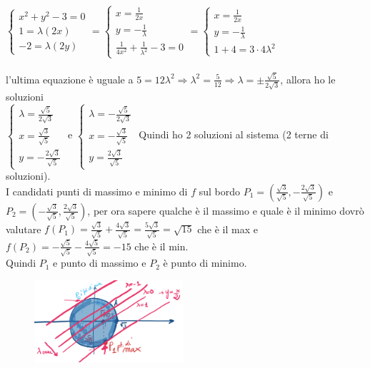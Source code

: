 \begin{example}
\begin{enumerate}
\begin{enumerate}
        $\begin{cases}x^2 + y^2 - 3 = 0 \\ 1 = \lambda (2x) \\ -2 = \lambda(2y)\end{cases} = \begin{cases}x = \frac{1}{2x} \\ y = -\frac{1}{\lambda} \\ \frac{1}{4x^2} + \frac{1}{\lambda^2} - 3 = 0\end{cases} = \begin{cases}x = \frac{1}{2x} \\ y = -\frac{1}{\lambda} \\ 1 + 4 = 3 \cdot 4 \lambda^2\end{cases}$\\\\
        l'ultima equazione è uguale a $5 = 12\lambda^2 \Longrightarrow \lambda^2 = \frac{5}{12} \Longrightarrow \lambda = \pm \frac{\sqrt{5}}{2\sqrt{3}}$, allora ho le soluzioni\\
        $\begin{cases}\lambda = \frac{\sqrt{5}}{2\sqrt{3}} \\ x = \frac{\sqrt{3}}{\sqrt{5}} \\ y = -\frac{2\sqrt{3}}{\sqrt{5}}\end{cases}$ e $\begin{cases}\lambda = -\frac{\sqrt{5}}{2\sqrt{3}} \\ x = -\frac{\sqrt{3}}{\sqrt{5}} \\ y = \frac{2\sqrt{3}}{\sqrt{5}}\end{cases}$ Quindi ho 2 soluzioni al sistema (2 terne di soluzioni).\\
        I candidati punti di massimo e minimo di $f$ sul bordo $P_1 = (\frac{\sqrt{3}}{\sqrt{5}}, -\frac{2\sqrt{3}}{\sqrt{5}})$ e $P_2 = (-\frac{\sqrt{3}}{\sqrt{5}}, \frac{2\sqrt{3}}{\sqrt{5}})$, per ora sapere qualche è il massimo e quale è il minimo dovrò valutare $f(P_1) = \frac{\sqrt{3}}{\sqrt{5}} + \frac{4\sqrt{3}}{\sqrt{5}} = \frac{5 \sqrt{3}}{\sqrt{5}} = \sqrt{15}$ che è il max e $f(P_2) = -\frac{\sqrt{5}}{\sqrt{5}} - \frac{4\sqrt{5}}{\sqrt{5}} = -15$ che è il min.\\
        Quindi $P_1$ e punto di massimo e $P_2$ è punto di minimo.
    \end{enumerate}
\end{enumerate}
\end{example}
\begin{figure}
\vspace{-10pt}
    \centering
    \includegraphics[width=5.5cm]{images/ess-moltip-lagrange-1.png}
\end{figure}
